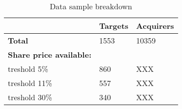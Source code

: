 \small
\begin{center}

\begin{table}
  \begin{tabular}{p{4cm}p{2cm}p{2cm}}
  
\hline
\textbf{} & \textbf{Targets} & \textbf{Acquirers}\\
\hline
\textbf{Total} & 1553 & 10359\\
\textbf{Share price available:}\\
{treshold 5\%}&860&XXX\\
{treshold 11\%}&557&XXX\\
{treshold 30\%}&340&XXX\\
\end{tabular}
  \caption{Data sample breakdown}
  \label{table1}
\end{table}

\end{center}